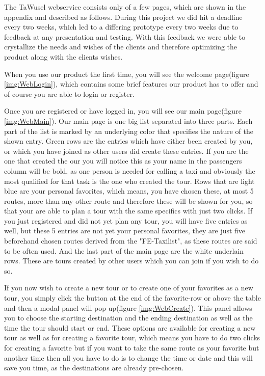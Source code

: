The TaWusel webservice consists only of a few pages, which are shown in the appendix and described as follows.
During this project we did hit a deadline every two weeks, which led to a differing prototype every two weeks due to feedback at
any presentation and testing. With this feedback we were able to crystallize the needs and wishes of the clients and therefore
optimizing the product along with the clients wishes.\newline

When you use our product the first time, you will see the welcome page(figure \ref{img:WebLogin}), which contains some brief
features our product has to offer and of course you are able to login or register.\newline


Once you are registered or have logged in, you will see our main page(figure \ref{img:WebMain}). Our main page is one big list
separated into three parts. Each part of the list is marked by an underlying color that specifies the nature of the shown entry.
\indent Green rows are the entries which have either been created by you, or which you have joined as other users did create these
entries. If you are the one that created the our you will notice this as your name in the passengers column will be bold, as one
person is needed for calling a taxi and obviously the most qualified for that task is the one who created the tour.\newline
\indent Rows that are light blue are your personal favorites, which means, you have chosen these, at most 5 routes, more than any
other route and therefore these will be shown for you, so that your are able to plan a tour with the same specifics with just
two clicks.
If you just registered and did not yet plan any tour, you will have five entries as well, but these 5 entries are not yet your
personal favorites, they are just five beforehand chosen routes derived from the "FE-Taxilist", as these routes are said to
be often used.\newline
\indent And the last part of the main page are the white underlain rows. These are tours created by other users which you can
join if you wish to do so.\newline

If you now wish to create a new tour or to create one of your favorites as a new tour, you simply click the button at the end of
the favorite-row or above the table and then a modal panel will pop up(figure \ref{img:WebCreate}). This panel allows you to
choose the starting destination and the ending destination as well as the time the tour should start or end. These options are
available for creating a new tour as well as for creating a favorite tour, which means you have to do two clicks for creating a
favorite but if you want to take the same route as your favorite but another time then all you have to do is to change the time
or date and this will save you time, as the destinations are already pre-chosen.\newline

